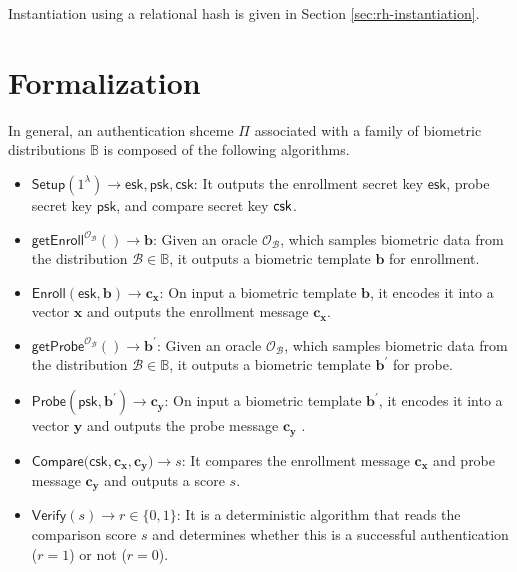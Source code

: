 Instantiation using a relational hash is given in Section \ref{sec:rh-instantiation}.




\section{Formalization}
\label{sec:formalization}


In general, an authentication shceme $\Pi$ associated with a family of biometric distributions $\mathbb{B}$ is composed of the following algorithms.

\begin{itemize}

	\item $\textsf{Setup}(1^\lambda) \to \textsf{esk}, \textsf{psk}, \textsf{csk}$: It outputs the enrollment secret key $\textsf{esk}$, probe secret key $\textsf{psk}$, and compare secret key $\sf csk$.

	\item $\textsf{getEnroll}^{\mathcal{O}_{\mathcal{B}}}() \to \mathbf{b}$: Given an oracle $\mathcal{O}_{\mathcal{B}}$, which samples biometric data from the distribution $\mathcal{B} \in \mathbb{B}$, it outputs a biometric template $\mathbf{b}$ for enrollment.

	\item $\textsf{Enroll}(\textsf{esk}, \mathbf{b}) \to \mathbf{c_x}$: On input a biometric template $\mathbf{b}$, it encodes it into a vector $\mathbf{x}$ and outputs the enrollment message $\mathbf{c_x}$.
	
	\item $\textsf{getProbe}^{\mathcal{O}_{\mathcal{B}}}() \to \mathbf{b}^\prime$: Given an oracle $\mathcal{O}_{\mathcal{B}}$, which samples biometric data from the distribution $\mathcal{B} \in \mathbb{B}$, it outputs a biometric template $\mathbf{b}^\prime$ for probe.

	\item $\textsf{Probe}(\textsf{psk}, \mathbf{b}^\prime) \to \mathbf{c_y}$: On input a biometric template $\mathbf{b}^\prime$, it encodes it into a vector $\mathbf{y}$ and outputs the probe message $\mathbf{c_y}$ .

	\item $\textsf{Compare}(\textsf{csk}, \mathbf{c_x}, \mathbf{c_y)} \to s$: It compares the enrollment message $\mathbf{c_x}$ and probe message $\mathbf{c_y}$ and outputs a score $s$.

	\item $\textsf{Verify}(s) \to r \in \{0,1\}$: It is a deterministic algorithm that reads the comparison score $s$ and determines whether this is a successful authentication ($r = 1$) or not ($r = 0$).

\end{itemize}


